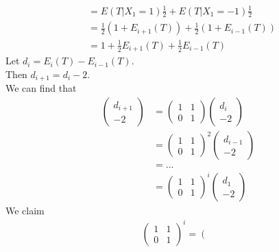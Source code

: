 \documentclass{extarticle}
\theoremstyle{plain}
\theoremstyle{definition}
\begin{document}
\begin{enumerate}
\begin{align*}
	  	  		 &= E(T|X_1 = 1) \frac{1}{2} + E(T|X_1 = -1)\frac{1}{2} \\
	  	  		 &=\frac{1}{2}\left(1+E_{i+1}(T)\right) + \frac{1}{2}\left(1+E_{i-1}(T)\right)\\
	  	  		 &=1+\frac{1}{2}E_{i+1}(T) + \frac{1}{2}E_{i-1}(T)		
	  	\end{align*} 
		Let $d_i = E_i(T) - E_{i-1}(T)$.\\
		Then $d_{i+1} = d_i - 2$.\\
		We can find that 
		\begin{align*}
		  \left( \begin{array}{c}
		  	d_{i+1} \\
		  	-2
		  \end{array}
		  \right)
		   &= 
		  \left( 
		  		\begin{array}{cc}
		  		  1& 1 \\
		  		  0& 1
		  		\end{array}
		  \right)
		  \left( \begin{array}{c}
		  	d_{i} \\
		  	-2
		  \end{array}
		  \right) \\
		  &= 
		  \left( 
		  		\begin{array}{cc}
		  		  1& 1 \\
		  		  0& 1
		  		\end{array}
		  \right)^2
		  \left( \begin{array}{c}
		  	d_{i-1} \\
		  	-2
		  \end{array}
			\right) \\
		&= \ldots \\
		&=
		  \left( 
		  		\begin{array}{cc}
		  		  1& 1 \\
		  		  0& 1
		  		\end{array}
		  	  \right)^{i}
		  \left( \begin{array}{c}
		  	d_{1} \\
			-2
		  \end{array}
		\right) 
		\end{align*}
	We claim 
	\begin{align*}
		\left( 
		  		\begin{array}{cc}
		  		  1& 1 \\
		  		  0& 1
		  		\end{array}
		  \right)^i
		  =
		 \left( 
		  		\begin{array}{cc}

\end{array}
\end{align*}
\end{enumerate}
\end{document}
